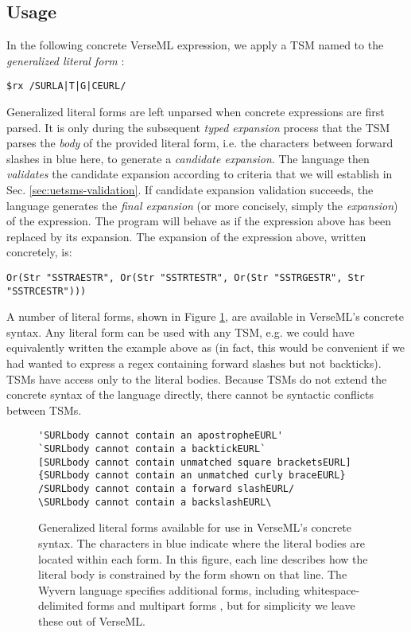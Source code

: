 \subsection{Usage}\label{sec:uetsms-usage}
In the following  concrete VerseML expression, we apply a TSM named  to the \emph{generalized literal form} :
\begin{lstlisting}[numbers=none,mathescape=|]
$rx /SURLA|T|G|CEURL/
\end{lstlisting}
Generalized literal forms are left unparsed when concrete expressions are first parsed. It is only during the subsequent \emph{typed expansion} process that the TSM parses the \emph{body} of the provided literal form, i.e. the characters between forward slashes in blue here, to generate a \emph{candidate expansion}. The language then \emph{validates} the candidate expansion according to criteria that we will establish in Sec. \ref{sec:uetsms-validation}. If candidate expansion validation succeeds, the language generates the \emph{final expansion} (or more concisely, simply the \emph{expansion}) of the expression. The program will behave as if the expression above has been replaced by its expansion. The expansion of the expression above, written concretely, is:
\begin{lstlisting}[numbers=none]
Or(Str "SSTRAESTR", Or(Str "SSTRTESTR", Or(Str "SSTRGESTR", Str "SSTRCESTR")))
\end{lstlisting}

A number of literal forms, shown in Figure \ref{fig:literal-forms},  are available in VerseML's concrete syntax. Any literal form can be used with any TSM, e.g. we could have equivalently written the example above as  (in fact, this would be convenient if we had wanted to express a regex containing forward slashes but not backticks). TSMs have access only to the literal bodies. Because TSMs do not extend the concrete syntax of the language directly, there cannot be syntactic conflicts between TSMs.


\begin{figure}
\begin{lstlisting}
'SURLbody cannot contain an apostropheEURL'
`SURLbody cannot contain a backtickEURL`
[SURLbody cannot contain unmatched square bracketsEURL]
{SURLbody cannot contain an unmatched curly braceEURL}
/SURLbody cannot contain a forward slashEURL/
\SURLbody cannot contain a backslashEURL\
\end{lstlisting}
\caption[Available Generalized Literal Forms]{Generalized literal forms available for use in VerseML's concrete syntax. The characters in blue indicate where the literal bodies are located within each form. In this figure, each line describes how the literal body is constrained by the form shown on that line. The Wyvern language specifies additional forms, including whitespace-delimited forms \cite{TSLs} and multipart forms \cite{sac15}, but for simplicity we leave these out of VerseML.}
\label{fig:literal-forms}
\end{figure}
